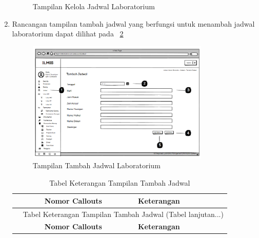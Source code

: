 \begin{enumerate}
\begin{figure}
		      \caption{Tampilan Kelola Jadwal Laboratorium}
		      \label{fig:jadwal}
	      \end{figure}
	\item Rancangan tampilan tambah jadwal yang berfungsi untuk menambah jadwal laboratorium dapat dilihat pada \pic~\ref{fig:jadwal}
	      \begin{figure}
		      \centering
		      \includegraphics[width=0.82\textwidth]{konten/gambar/tambah-jadwal.png}
		      \caption{Tampilan Tambah Jadwal Laboratorium}
		      \label{fig:jadwal}
	      \end{figure}
	      \begin{longtable}{c p{}}
		      \caption{Tabel Keterangan Tampilan Tambah Jadwal}
		      \label{tab:tambah-jadwal}                                                                                                                                                               \\
		      \hline
		      \textbf{Nomor Callouts} & \textbf{Keterangan}                                                                                                                                           \\
		      \hline
		      \endfirsthead

		      \multicolumn{2}{c}{\small\tablename\ \thetable\ {Tabel Keterangan Tampilan Tambah Jadwal} \space (Tabel lanjutan...)}                                                                   \\
		      \hline
		      \textbf{Nomor Callouts} & \textbf{Keterangan}                                                                                                                                           \\
		      \hline
		      \endhead


\end{longtable}
\end{enumerate}
